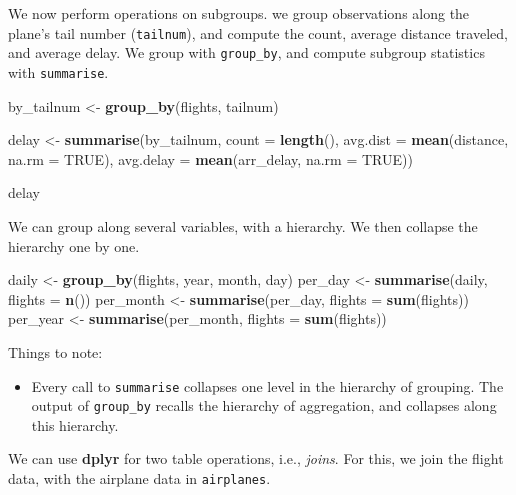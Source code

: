 \documentclass[]{book}
\newenvironment{Shaded}{\begin{snugshade}}{\end{snugshade}}
\newcommand{\DataTypeTok}[1]{\textcolor[rgb]{0.13,0.29,0.53}{#1}}
\newcommand{\KeywordTok}[1]{\textcolor[rgb]{0.13,0.29,0.53}{\textbf{#1}}}
\newcommand{\NormalTok}[1]{#1}
\newcommand{\OtherTok}[1]{\textcolor[rgb]{0.56,0.35,0.01}{#1}}
\newcommand{\StringTok}[1]{\textcolor[rgb]{0.31,0.60,0.02}{#1}}
\providecommand{\tightlist}{%
  \setlength{\itemsep}{0pt}\setlength{\parskip}{0pt}}
\theoremstyle{definition}
\theoremstyle{definition}
\theoremstyle{definition}
\theoremstyle{remark}
\begin{document}
We now perform operations on subgroups.
we group observations along the plane's tail number (\texttt{tailnum}), and compute the count, average distance traveled, and average delay.
We group with \texttt{group\_by}, and compute subgroup statistics with \texttt{summarise}.

\begin{Shaded}
\begin{Highlighting}[]
\NormalTok{by_tailnum <-}\StringTok{ }\KeywordTok{group_by}\NormalTok{(flights, tailnum)}

\NormalTok{delay <-}\StringTok{ }\KeywordTok{summarise}\NormalTok{(by_tailnum,}
  \DataTypeTok{count =} \KeywordTok{length}\NormalTok{(),}
  \DataTypeTok{avg.dist =} \KeywordTok{mean}\NormalTok{(distance, }\DataTypeTok{na.rm =} \OtherTok{TRUE}\NormalTok{),}
  \DataTypeTok{avg.delay =} \KeywordTok{mean}\NormalTok{(arr_delay, }\DataTypeTok{na.rm =} \OtherTok{TRUE}\NormalTok{))}

\NormalTok{delay}
\end{Highlighting}
\end{Shaded}

We can group along several variables, with a hierarchy.
We then collapse the hierarchy one by one.

\begin{Shaded}
\begin{Highlighting}[]
\NormalTok{daily <-}\StringTok{ }\KeywordTok{group_by}\NormalTok{(flights, year, month, day)}
\NormalTok{per_day   <-}\StringTok{ }\KeywordTok{summarise}\NormalTok{(daily, }\DataTypeTok{flights =} \KeywordTok{n}\NormalTok{())}
\NormalTok{per_month <-}\StringTok{ }\KeywordTok{summarise}\NormalTok{(per_day, }\DataTypeTok{flights =} \KeywordTok{sum}\NormalTok{(flights))}
\NormalTok{per_year  <-}\StringTok{ }\KeywordTok{summarise}\NormalTok{(per_month, }\DataTypeTok{flights =} \KeywordTok{sum}\NormalTok{(flights))}
\end{Highlighting}
\end{Shaded}

Things to note:

\begin{itemize}
\tightlist
\item
  Every call to \texttt{summarise} collapses one level in the hierarchy of grouping. The output of \texttt{group\_by} recalls the hierarchy of aggregation, and collapses along this hierarchy.
\end{itemize}

We can use \textbf{dplyr} for two table operations, i.e., \emph{joins}.
For this, we join the flight data, with the airplane data in \texttt{airplanes}.
\end{document}
